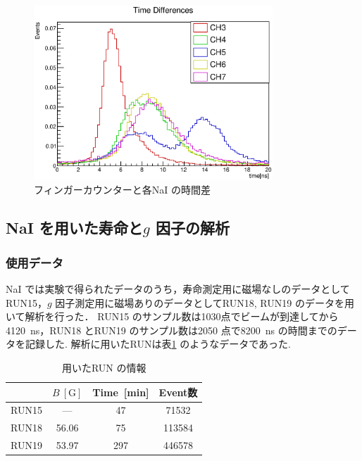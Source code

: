 \begin{figure}[hbt]
\centering
\includegraphics[width=0.8\textwidth]{figure/hatano/coincidence.eps}
\caption{フィンガーカウンターと各NaI の時間差}
\label{hatano_fig:coincidence}
\end{figure}


\subsection{NaI を用いた寿命と$g$ 因子の解析}
\subsubsection{使用データ}
NaI では実験で得られたデータのうち，寿命測定用に磁場なしのデータとしてRUN15，$g$ 因子測定用に磁場ありのデータとしてRUN18, RUN19 のデータを用いて解析を行った．
RUN15 のサンプル数は1030点でビームが到達してから4120~ns，RUN18 とRUN19 のサンプル数は2050 点で8200~ns の時間までのデータを記録した.
解析に用いたRUNは表\ref{tab:RUN_info} のようなデータであった.

\begin{table}[H]%
\caption{用いたRUN の情報}
\centering
\begin{tabular}{cccc}\toprule
{} & $B~[\mathrm{G}]$ & Time~[min] & Event数\\ \midrule
RUN15 & --- & 47 & 71532 \\
RUN18 & 56.06 & 75 & 113584 \\
RUN19 & 53.97 & 297 & 446578 \\ \bottomrule
\end{tabular}
\label{tab:RUN_info}
\end{table}

